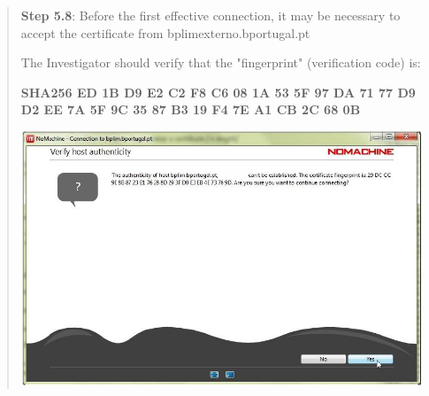 \documentclass[
  11pt,
  a4paper,
]{article}
\begin{document}
\begin{quote}
\textbf{Step 5.8}: Before the first effective connection, it may be
necessary to accept the certificate from bplimexterno.bportugal.pt

The Investigator should verify that the "fingerprint" (verification
code) is:

\textbf{SHA256 ED 1B D9 E2 C2 F8 C6 08 1A 53 5F 97 DA 71 77 D9 D2 EE 7A
5F 9C 35 87 B3 19 F4 7E A1 CB 2C 68 0B}

\includegraphics[width=4.72441in,height=2.98511in]{./media/image33.png}
\end{quote}

\textbf{\hfill\break
}
\end{document}
